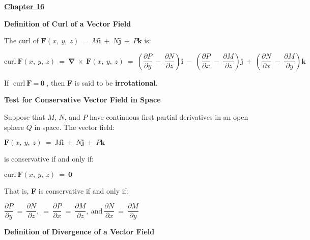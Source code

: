 \documentclass{article}
\begin{document}
\begin{large}
\vspace{0.25in}

\underline{\textbf{\huge Chapter 16 \phantom{ } \phantom{ } \phantom{ } \phantom{ }}}

\textbf{Definition of Curl of a Vector Field}

\hspace{0.1in} The curl of $\textbf{F}(x,\ y,\ z)\ =\ M\textbf{i}\ +\ N\textbf{j}\ +\ P\textbf{k}$ is:

\hspace{0.2in} {\large $\text{curl}\ \textbf{F}(x,\ y,\ z)\ =\ \mathbf{\nabla}\ \times\ \textbf{F}(x,\ y,\ z)\ =\ \left(\dfrac{\partial P}{\partial y}\ -\ \dfrac{\partial N}{\partial z}\right)\textbf{i}\ -\ \left(\dfrac{\partial P}{\partial x}\ -\ \dfrac{\partial M}{\partial z}\right)\textbf{j}\ +\ \left(\dfrac{\partial N}{\partial x}\ -\ \dfrac{\partial M}{\partial y}\right)\textbf{k}$}

\hspace{0.1in} If $\text{curl}\ \textbf{F}\ =\ \textbf{0}$, then \textbf{F} is said to be \textbf{irrotational}.

\vspace{0.8in}
\textbf{Test for Conservative Vector Field in Space}

\vspace{-0.2in}
\hspace{0.1in} Suppose that $M$, $N$, and $P$ have continuous first partial derivatives in an open sphere $Q$ in space.  The vector field:

\hspace{2.5in} $\textbf{F}(x,\ y,\ z)\ =\ M\textbf{i}\ +\ N\textbf{j}\ +\ P\textbf{k}$

\hspace{0.1in} is conservative if and only if:

\vspace{-0.1in}
\hspace{2.5in} $\text{curl}\ \textbf{F}(x,\ y,\ z)\ =\ \textbf{0}$

\hspace{0.1in} That is, \textbf{F} is conservative if and only if:

\hspace{1.5in} $\dfrac{\partial P}{\partial y}\ =\ \dfrac{\partial N}{\partial z},\ =\ \dfrac{\partial P}{\partial x}\ =\ \dfrac{\partial M}{\partial z},\ \text{and}\ \dfrac{\partial N}{\partial x}\ =\ \dfrac{\partial M}{\partial y}$

\textbf{Definition of Divergence of a Vector Field}


\end{large}
\end{document}
